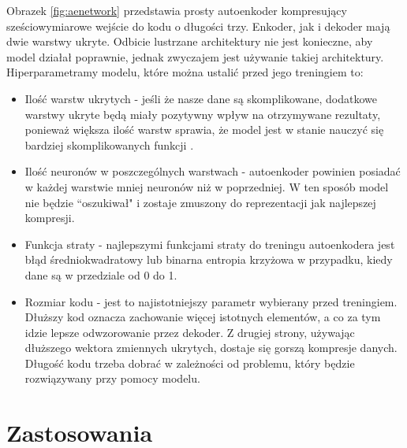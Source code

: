 \documentclass[a4paper,12pt,oneside]{book} %
\begin{document}
Obrazek \ref{fig:aenetwork} przedstawia prosty autoenkoder kompresujący sześciowymiarowe wejście do kodu o długości trzy. Enkoder, jak i dekoder mają dwie warstwy ukryte. Odbicie lustrzane architektury nie jest konieczne, aby model działał poprawnie, jednak zwyczajem jest używanie takiej architektury.\\
Hiperparametramy modelu, które można ustalić przed jego treningiem to:
\begin{itemize}
	\item Ilość warstw ukrytych - jeśli że nasze dane są skomplikowane, dodatkowe warstwy ukryte będą miały pozytywny wpływ na otrzymywane rezultaty, ponieważ większa ilość warstw sprawia, że model jest w stanie nauczyć się bardziej skomplikowanych funkcji \cite{telgarsky2016benefits, eldan2016power}.
	\item Ilość neuronów w poszczególnych warstwach - autoenkoder powinien posiadać w każdej warstwie mniej neuronów niż w poprzedniej. W ten sposób model nie będzie ``oszukiwał" i zostaje zmuszony do reprezentacji jak najlepszej kompresji.
	\item Funkcja straty - najlepszymi funkcjami straty do treningu autoenkodera jest błąd średniokwadratowy lub binarna entropia krzyżowa w przypadku, kiedy dane są w przedziale od 0 do 1.
	\item Rozmiar kodu - jest to najistotniejszy parametr wybierany przed treningiem. Dłuższy kod oznacza zachowanie więcej istotnych elementów, a co za tym idzie lepsze odwzorowanie przez dekoder. Z drugiej strony, używając dłuższego wektora zmiennych ukrytych, dostaje się gorszą kompresje danych. Długość kodu trzeba dobrać w zależności od problemu, który będzie rozwiązywany przy pomocy modelu.
\end{itemize}
\section{Zastosowania}
\end{document}
